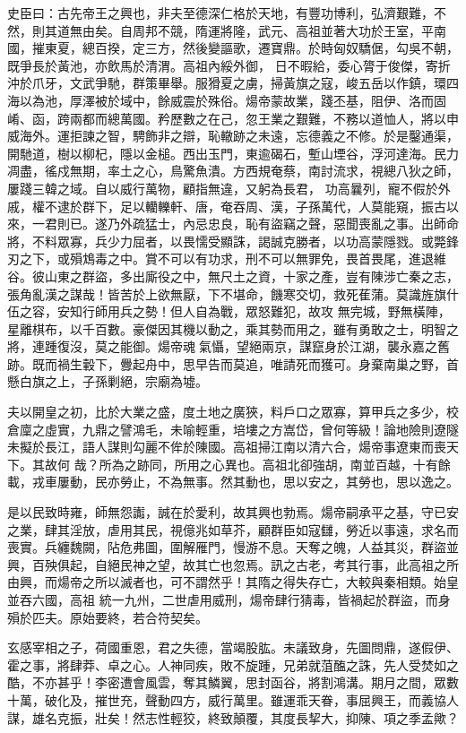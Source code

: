 \begin{pinyinscope}
 史臣曰：古先帝王之興也，非夫至德深仁格於天地，有豐功博利，弘濟艱難，不然，則其道無由矣。自周邦不競，隋運將隆，武元、高祖並著大功於王室，平南國，摧東夏，總百揆，定三方，然後變謳歌，遷寶鼎。於時匈奴驕倨，勾吳不朝，既爭長於黃池，亦飲馬於清渭。高祖內綏外御，
 日不暇給，委心膂于俊傑，寄折沖於爪牙，文武爭馳，群策畢舉。服猾夏之虜，掃黃旗之寇，峻五岳以作鎮，環四海以為池，厚澤被於域中，餘威震於殊俗。煬帝蒙故業，踐丕基，阻伊、洛而固崤、函，跨兩都而總萬國。矜歷數之在己，忽王業之艱難，不務以道恤人，將以申威海外。運拒諫之智，騁飾非之辯，恥轍跡之未遠，忘德義之不修。於是鑿通渠，開馳道，樹以柳杞，隱以金槌。西出玉門，東逾碣石，塹山堙谷，浮河達海。民力凋盡，徭戍無期，率土之心，鳥驚魚潰。方西規奄蔡，南討流求，視總八狄之師，屢踐三韓之域。自以威行萬物，顧指無違，又躬為長君，
 功高曩列，寵不假於外戚，權不逮於群下，足以轥轢軒、唐，奄吞周、漢，子孫萬代，人莫能窺，振古以來，一君則已。遂乃外疏猛士，內忌忠良，恥有盜竊之聲，惡聞喪亂之事。出師命將，不料眾寡，兵少力屈者，以畏懦受顯誅，謁誠克勝者，以功高蒙隱戮。或斃鋒刃之下，或殞鴆毒之中。賞不可以有功求，刑不可以無罪免，畏首畏尾，進退維谷。彼山東之群盜，多出廝役之中，無尺土之資，十家之產，豈有陳涉亡秦之志，張角亂漢之謀哉！皆苦於上欲無厭，下不堪命，饑寒交切，救死萑蒲。莫識旌旗什伍之容，安知行師用兵之勢！但人自為戰，眾怒難犯，故攻
 無完城，野無橫陣，星離棋布，以千百數。豪傑因其機以動之，乘其勢而用之，雖有勇敢之士，明智之將，連踵復沒，莫之能御。煬帝魂氣懾，望絕兩京，謀竄身於江湖，襲永嘉之舊跡。既而禍生轂下，釁起舟中，思早告而莫追，唯請死而獲可。身棄南巢之野，首懸白旗之上，子孫剿絕，宗廟為墟。



 夫以開皇之初，比於大業之盛，度土地之廣狹，料戶口之眾寡，算甲兵之多少，校倉廩之虛實，九鼎之譬鴻毛，未喻輕重，培塿之方嵩岱，曾何等級！論地險則遼隧未擬於長江，語人謀則勾麗不侔於陳國。高祖掃江南以清六合，煬帝事遼東而喪天下。其故何
 哉？所為之跡同，所用之心異也。高祖北卻強胡，南並百越，十有餘載，戎車屢動，民亦勞止，不為無事。然其動也，思以安之，其勞也，思以逸之。



 是以民致時雍，師無怨讟，誠在於愛利，故其興也勃焉。煬帝嗣承平之基，守已安之業，肆其淫放，虐用其民，視億兆如草芥，顧群臣如寇讎，勞近以事遠，求名而喪實。兵纏魏闕，阽危弗圖，圍解雁門，慢游不息。天奪之魄，人益其災，群盜並興，百殃俱起，自絕民神之望，故其亡也忽焉。訊之古老，考其行事，此高祖之所由興，而煬帝之所以滅者也，可不謂然乎！其隋之得失存亡，大較與秦相類。始皇並吞六國，高祖
 統一九州，二世虐用威刑，煬帝肆行猜毒，皆禍起於群盜，而身殞於匹夫。原始要終，若合符契矣。



 玄感宰相之子，荷國重恩，君之失德，當竭股肱。未議致身，先圖問鼎，遂假伊、霍之事，將肆莽、卓之心。人神同疾，敗不旋踵，兄弟就菹醢之誅，先人受焚如之酷，不亦甚乎！李密遭會風雲，奪其鱗翼，思封函谷，將割鴻溝。期月之間，眾數十萬，破化及，摧世充，聲動四方，威行萬里。雖運乖天眷，事屈興王，而義協人謀，雄名克振，壯矣！然志性輕狡，終致顛覆，其度長挈大，抑陳、項之季孟歟？



\end{pinyinscope}